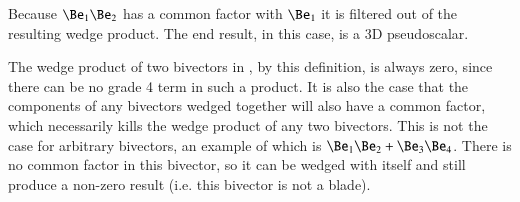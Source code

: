 Because \( \Be_1 \Be_2 \) has a common factor with \( \Be_1 \) it is filtered out of the resulting wedge product.  The end result, in this case, is a 3D pseudoscalar.

The wedge product of two bivectors in , by this definition, is always zero, since there can be no grade 4 term in such a product.  It is also the case that the components of any  bivectors wedged together will also have a common factor, which necessarily kills the wedge product of any two  bivectors.  This is not the case for arbitrary  bivectors, an example of which is \( \Be_1 \Be_2 + \Be_3 \Be_4 \).  There is no common factor in this bivector, so it can be wedged with itself and still produce a non-zero result (i.e. this bivector is not a blade).
